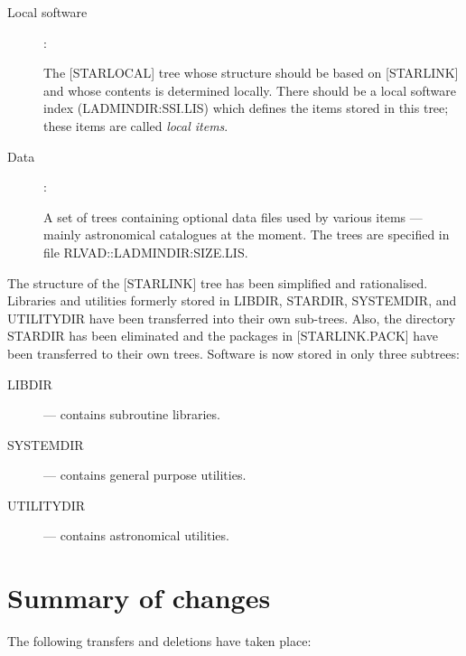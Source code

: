 \begin{description}
\begin{description}
\item [Local software] :

 The [STARLOCAL] tree whose structure should be based on \mbox{[STARLINK]} and
 whose contents is determined locally.
 There should be a local software index (LADMINDIR:SSI.LIS) which defines the
 items stored in this tree; these items are called {\em local items}.

\item [Data] :

 A set of trees containing optional data files used by various items --- mainly
 astronomical catalogues at the moment.
 The trees are specified in file RLVAD::LADMINDIR:SIZE.LIS.

\end{description}
\end{description}

The structure of the [STARLINK] tree has been simplified and rationalised.
Libraries and utilities formerly stored in LIBDIR, STARDIR, SYSTEMDIR, and
UTILITYDIR have been transferred into their own sub-trees.
Also, the directory STARDIR has been eliminated and the packages in
[STARLINK.PACK] have been transferred to their own trees.
Software is now stored in only three subtrees:
\begin{description}
\begin{description}
\item [LIBDIR] --- contains subroutine libraries.
\item [SYSTEMDIR] --- contains general purpose utilities.
\item [UTILITYDIR] --- contains astronomical utilities.
\end{description}
\end{description}

\section{Summary of changes}

The following transfers and deletions have taken place:

